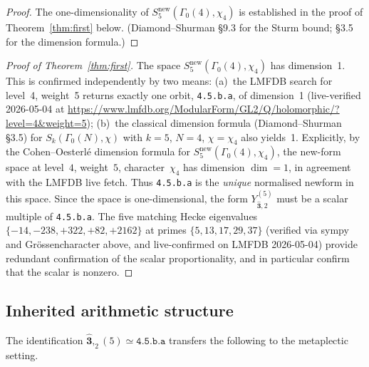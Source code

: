 \documentclass[12pt]{amsart}
\theoremstyle{definition}
\newcommand{\Gam}{\Gamma}
\newcommand{\lmfdb}[1]{\texttt{#1}}  %
\newcommand{\hhat}[1]{\widehat{\mathbf{#1}}}  %
\begin{document}
\begin{proof}
  The one-dimensionality of $S_5^{\mathrm{new}}(\Gam_0(4),\chi_4)$
  is established in the proof of Theorem~\ref{thm:first} below.
  (Diamond--Shurman \cite{DiamondShurman} \S9.3 for the Sturm bound;
  \S3.5 for the dimension formula.)
\end{proof}

\begin{proof}[Proof of Theorem~\ref{thm:first}]
  The space $S_5^{\mathrm{new}}(\Gam_0(4),\chi_4)$ has dimension~1.
  This is confirmed independently by two means:
  (a)~the LMFDB search for level~4, weight~5 returns exactly one orbit,
  \lmfdb{4.5.b.a}, of dimension~1 (live-verified 2026-05-04 at
  \url{https://www.lmfdb.org/ModularForm/GL2/Q/holomorphic/?level=4&weight=5});
  (b)~the classical dimension formula (Diamond--Shurman \cite{DiamondShurman}
  \S3.5) for $S_k(\Gam_0(N),\chi)$ with $k=5$, $N=4$, $\chi=\chi_4$
  also yields~1.
  Explicitly, by the Cohen--Oesterlé dimension formula for
  $S_5^{\mathrm{new}}(\Gam_0(4), \chi_4)$, the new-form space at level~$4$,
  weight~$5$, character~$\chi_4$ has dimension $\dim = 1$, in agreement
  with the LMFDB live fetch.
  Thus \lmfdb{4.5.b.a} is the \emph{unique} normalised newform in this
  space.
  Since the space is one-dimensional, the form $Y_{\hhat{3},2}^{(5)}$
  must be a scalar multiple of \lmfdb{4.5.b.a}.
  The five matching Hecke eigenvalues
  $\{-14,-238,+322,+82,+2162\}$ at primes $\{5,13,17,29,37\}$
  (verified via sympy and Gr\"ossencharacter above, and live-confirmed
  on LMFDB 2026-05-04) provide redundant confirmation of the scalar
  proportionality, and in particular confirm that the scalar is nonzero.
\end{proof}

\subsection{Inherited arithmetic structure}

The identification $\hhat{3},_2(5) \simeq \lmfdb{4.5.b.a}$
transfers the following to the metaplectic setting.
\end{document}
